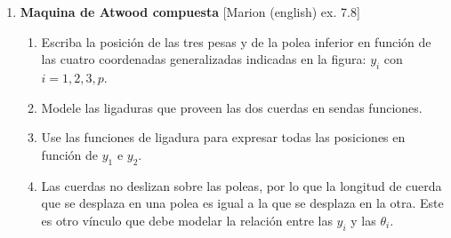 \documentclass[11pt, spanish, a4paper, twoside]{article}
\begin{document}
\begin{enumerate}
	\item
	\begin{minipage}[t][6.8cm]{0.67\textwidth}
		\textbf{Maquina de Atwood compuesta} [Marion (english) ex. 7.8]\\ 
		\begin{enumerate}
			\item Escriba la posición de las tres pesas y de la polea inferior en función de 
			las cuatro coordenadas generalizadas indicadas en la figura: \(y_i\) con \(i = 1,2,3,p\). 
			\item Modele las ligaduras que proveen las dos cuerdas en sendas funciones.
			\item Use las funciones de ligadura para expresar todas las posiciones en función de \(y_1\) e \(y_2\).
			\item Las cuerdas no deslizan sobre las poleas, por lo que la longitud de cuerda que se desplaza en una polea es igual a la que se desplaza en la otra.
			Este es otro vínculo que debe modelar la relación entre las \(y_i\) y las \(\theta_i\).  
		\end{enumerate}
	\end{minipage}
	\begin{minipage}[c][0cm][t]{0.3\textwidth}
		
	\end{minipage}


\end{enumerate}
\end{document}
